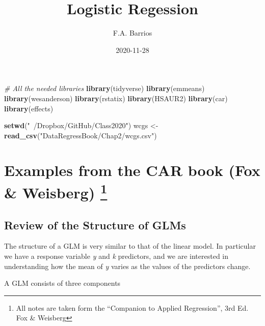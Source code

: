 \documentclass[
]{article}
\title{Logistic Regession}
\author{F.A. Barrios}
\date{2020-11-28}
\newenvironment{Shaded}{\begin{snugshade}}{\end{snugshade}}
\newcommand{\CommentTok}[1]{\textcolor[rgb]{0.56,0.35,0.01}{\textit{#1}}}
\newcommand{\KeywordTok}[1]{\textcolor[rgb]{0.13,0.29,0.53}{\textbf{#1}}}
\newcommand{\NormalTok}[1]{#1}
\newcommand{\StringTok}[1]{\textcolor[rgb]{0.31,0.60,0.02}{#1}}
\begin{document}
\maketitle

\begin{Shaded}
\begin{Highlighting}[]
\CommentTok{# All the needed libraries}
\KeywordTok{library}\NormalTok{(tidyverse)}
\KeywordTok{library}\NormalTok{(emmeans)}
\KeywordTok{library}\NormalTok{(wesanderson)}
\KeywordTok{library}\NormalTok{(rstatix)}
\KeywordTok{library}\NormalTok{(HSAUR2)}
\KeywordTok{library}\NormalTok{(car)}
\KeywordTok{library}\NormalTok{(effects)}

\KeywordTok{setwd}\NormalTok{(}\StringTok{"~/Dropbox/GitHub/Class2020"}\NormalTok{)}
\NormalTok{wcgs <-}\StringTok{ }\KeywordTok{read_csv}\NormalTok{(}\StringTok{"DataRegressBook/Chap2/wcgs.csv"}\NormalTok{)}
\end{Highlighting}
\end{Shaded}

\hypertarget{examples-from-the-car-book-fox-weisberg-1}{%
\section[Examples from the CAR book (Fox \& Weisberg)
]{\texorpdfstring{Examples from the CAR book (Fox \& Weisberg)
\footnote{All notes are taken form the ``Companion to Applied
  Regression'', 3rd Ed. Fox \& Weisberg}}{Examples from the CAR book (Fox \& Weisberg) }}\label{examples-from-the-car-book-fox-weisberg-1}}

\hypertarget{review-of-the-structure-of-glms}{%
\subsection{Review of the Structure of
GLMs}\label{review-of-the-structure-of-glms}}

The structure of a GLM is very similar to that of the linear model. In
particular we have a response variable \emph{y} and \emph{k} predictors,
and we are interested in understanding how the mean of \emph{y} varies
as the values of the predictors change.

A GLM consists of three components
\end{document}
